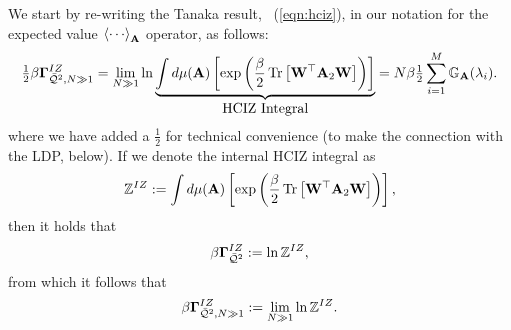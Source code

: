 We start by re-writing the Tanaka result, \EQN~(\ref{eqn:hciz}),
in our notation for the expected value $\Expected[\AMAT]{\cdots}$ operator, as follows:
\begin{equation}
\label{eqn:hciz2}
  \tfrac{1}{2}\beta\mathbf{\Gamma}^{IZ}_{\bar{\mathcal{Q}}^{2},N\gg 1} = \lim_{N\gg 1} \ln \underbrace{ \int d\mu(\mathbf{\mathbf{A}})\left[\exp\left(\frac{\beta}{2}\mbox{}\operatorname{Tr}\left[\mathbf{W}^{\top}\mathbf{A}_{2}\mathbf{W}\right]\right)\right] }_{\mbox{HCIZ Integral}} 
  = N\beta\tfrac{1}{2}\sum_{i=1}^{M}\mathbb{G}_{\mathbf{A}}(\lambda_{i})   .
\end{equation}
where we have added a $\tfrac{1}{2}$ for technical convenience (to make the connection with the LDP, below).
If we denote the internal HCIZ integral as 
\begin{equation}
\label{eqn:hciz_def}
  \mathbb{Z}^{IZ} := \int d\mu(\mathbf{\mathbf{A}})\left[\exp\left(\frac{\beta}{2}\mbox{}\operatorname{Tr}\left[\mathbf{W}^{\top}\mathbf{A}_{2}\mathbf{W}\right]\right)\right]  ,
 \end{equation}
then it holds that %
\begin{equation}
  \label{eqn:hciz_def2}
  \beta\mathbf{\Gamma}^{IZ}_{\bar{\mathcal{Q}}^{2}} :=  \ln\mathbb{Z}^{IZ}  ,
\end{equation}
from which it follows that %
\begin{equation}
\label{eqn:hciz_def3}
  \beta\mathbf{\Gamma}^{IZ}_{\bar{\mathcal{Q}}^{2},N\gg 1} := \lim_{N \gg 1} \ln\mathbb{Z}^{IZ}  .
\end{equation}
